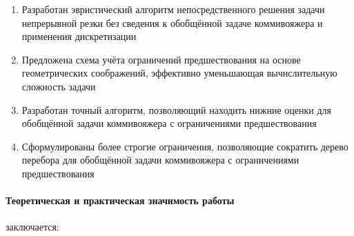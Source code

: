 \documentclass[14pt]{extarticle}
\begin{document}
\begin{enumerate}
    \item 
    Разработан эвристический алгоритм непосредственного решения 
    задачи непрерывной резки без сведения к обобщённой
    задаче коммивояжера и применения дискретизации
    \item 
    Предложена схема учёта ограничений предшествования на основе 
    геометрических соображений,
    эффективно уменьшающая вычислительную сложность задачи 
    \item 
    Разработан точный алгоритм,
    позволяющий находить нижние оценки для 
    обобщённой задачи коммивояжера с ограничениями предшествования
    \item
    Сформулированы более строгие ограничения,
    позволяющие сократить дерево перебора для обобщённой
    задачи коммивояжера с ограничениями предшествования
\end{enumerate}

\paragraph*{Теоретическая и практическая значимость работы} заключается:
\end{document}
